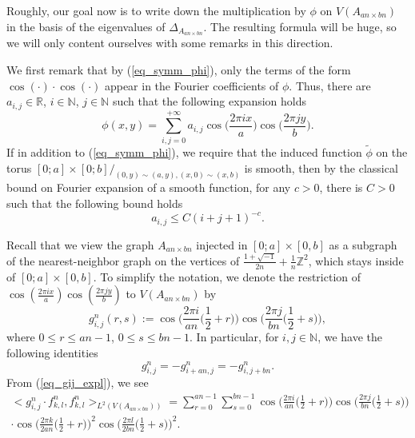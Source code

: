 \documentclass[12pt]{article}
\numberwithin{equation}{section}
\theoremstyle{theorem}
\theoremstyle{definition}
\theoremstyle{remark}
\newcommand{\imun} {\sqrt{-1}}
\newcommand{\real}{\mathbb{R}}
\newcommand{\nat}{\mathbb{N}}
\newcommand{\integ}{\mathbb{Z}}
\newcommand{\laplcomp}{\Delta}
\newcommand{\scal}[2]{\big< #1, #2 \big>}
\begin{document}
		\begin{sloppypar}
		Roughly, our goal now is to write down the multiplication by $\phi$ on $V(A_{an \times bn})$ in the basis of the eigenvalues of $\laplcomp_{A_{an \times bn}}$.
		The resulting formula will be huge, so we will only content ourselves with some remarks in this direction.
		\par We first remark that by (\ref{eq_symm_phi}), only the terms of the form $\cos(\cdot) \cdot \cos(\cdot)$ appear in the Fourier coefficients of $\phi$. Thus, there are $a_{i, j} \in \real$, $i \in \nat$, $j \in \nat$ such that the following expansion holds
		\begin{equation}\label{eq_phi_four_expansion}
			\phi(x, y) = \sum_{i, j = 0}^{+ \infty} a_{i, j} \cos \Big( \frac{2 \pi i x}{a} \Big) \cos \Big( \frac{2 \pi j y}{b} \Big).
		\end{equation}
		If in addition to (\ref{eq_symm_phi}), we require that the induced function $\tilde{\phi}$ on the torus $[0; a] \times [0; b]/_{(0, y) \sim (a, y), (x, 0) \sim (x, b)}$ is smooth, then by the classical bound on Fourier expansion of a smooth function, for any $c > 0$, there is $C > 0$ such that the following bound holds
		\begin{equation}\label{eq_asymp_bound_coeff}
			a_{i, j} \leq C (i + j + 1)^{-c}.
		\end{equation}
		\end{sloppypar}
		\par Recall that we view the graph $A_{an \times bn}$ injected in $[0; a] \times [0, b]$ as a subgraph of the nearest-neighbor graph on the vertices of $\frac{1 + \imun}{2n}  + \frac{1}{n} \integ^2$, which stays inside of $[0; a] \times [0, b]$.
		To simplify the notation, we denote the restriction of $\cos ( \frac{2 \pi i x}{a} ) \cos ( \frac{2 \pi j y}{b} )$ to $V(A_{an \times bn})$ by
		\begin{equation}\label{eq_gij_expl}
			g^{n}_{i, j}(r, s) := 
			\cos \Big( \frac{2 \pi i}{a n} \Big( \frac{1}{2} + r \Big) \Big)
			 \cos \Big( \frac{2 \pi j}{b n} \Big( \frac{1}{2} + s \Big) \Big),
		\end{equation}
		where $0 \leq r \leq an - 1$, $0 \leq s \leq bn - 1$.
		In particular, for $i, j \in \nat$, we have the following identities
		\begin{equation}\label{eq_gij_symm}
			g^{n}_{i, j} = - g^{n}_{i + an, j} = - g^{n}_{i, j + bn}.
		\end{equation}
		From (\ref{eq_gij_expl}), we see
		\begin{multline}
			\scal{g^{n}_{i, j} \cdot f^{n}_{k, l}}{f^{n}_{k, l}}_{L^2(V(A_{an \times bn}))}
			=
			\sum_{r = 0}^{an - 1} \sum_{s = 0}^{bn - 1}
			\cos \Big( \frac{2 \pi i}{a n} \Big( \frac{1}{2} + r \Big) \Big)
			\cos \Big( \frac{2 \pi j}{b n} \Big( \frac{1}{2} + s \Big) \Big)
			\\
			\cdot
			\cos \Big( \frac{2 \pi k}{2a n} \Big( \frac{1}{2} + r \Big) \Big)^2
			\cos \Big( \frac{2 \pi l}{2b n} \Big( \frac{1}{2} + s \Big) \Big)^2.
		\end{multline}
\end{document}

